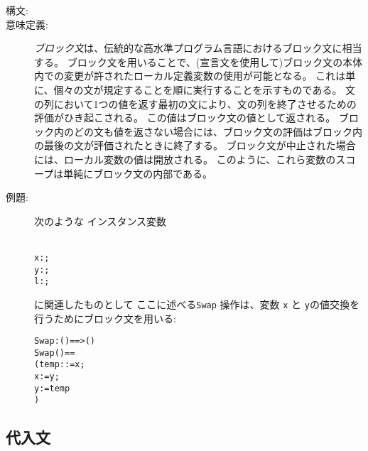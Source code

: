 \documentclass[\pformat,12pt]{jarticle}
\begin{document}
\begin{description}
\item[構文:]




\item[意味定義:] {\it ブロック文}は、伝統的な高水準プログラム言語におけるブロック文に相当する。
ブロック文を用いることで、(宣言文を使用して)ブロック文の本体内での変更が許されたローカル定義変数の使用が可能となる。
これは単に、個々の文が規定することを順に実行することを示すものである。
文の列において1つの値を返す最初の文により、文の列を終了させるための評価がひき起こされる。
この値はブロック文の値として返される。
ブロック内のどの文も値を返さない場合には、ブロック文の評価はブロック内の最後の文が評価されたときに終了する。
ブロック文が中止された場合には、ローカル変数の値は開放される。
このように、これら変数のスコープは単純にブロック文の内部である。
      
\item[例題:] 次のような
インスタンス変数
  \begin{alltt}\label{stdef}
    x:;
    y:;
    l:;
  \end{alltt}
に関連したものとして
ここに述べる\texttt{Swap} 操作は、変数 \texttt{x} と \texttt{y}の値交換を行うためにブロック文を用いる:
  \begin{alltt}
  Swap : () ==> ()
  Swap () ==
    ( temp:  := x;
     x := y;
     y := temp
    )
  \end{alltt}

\end{description}

\subsection{代入文}
\end{document}
